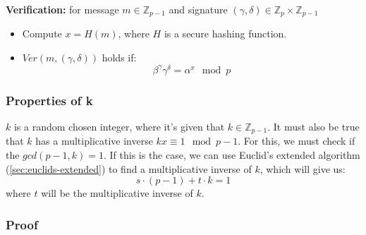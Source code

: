 \textbf{Verification:} for message $m \in \mathbb{Z}_{p-1}$ and
signature $(\gamma,\delta) \in \mathbb{Z}_p\times \mathbb{Z}_{p-1}$
\begin{itemize}
\item Compute $x = H(m)$, where $H$ is a secure hashing function.
\item $Ver(m, (\gamma,\delta))$ holds if:
  \[ \beta^{\gamma} \gamma^{\delta}= \alpha^x \mod p\]
\end{itemize}

\subsubsection*{Properties of k}
$k$ is a random chosen integer, where it's given that $k \in
\mathbb{Z}_{p-1}$. It must also be true that $k$ has a multiplicative
inverse $kx \equiv 1 \mod p - 1$. For this, we must check if the
$gcd(p-1,k) = 1$. If this is the case, we can use Euclid's extended
algorithm (\ref{sec:euclids-extended}) to find a multiplicative
inverse of $k$, which will give us:
\[s \cdot (p-1) + t \cdot k = 1\]
where $t$ will be the multiplicative inverse of $k$.

\subsubsection*{Proof}

